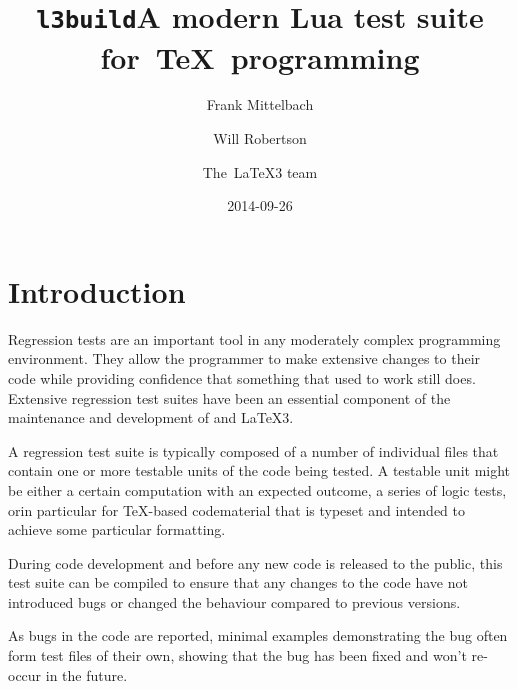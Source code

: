 \documentclass[final]{ltugboat}
\begin{document}
\title{\texttt{l3build}\Dash A modern Lua test suite for~\TeX~programming}
  \date{2014-09-26}

\author{Frank Mittelbach}
\address{Mainz, Germany}

\author{Will Robertson}
\address{School of Mechanical Engineering, The University of Adelaide, Australia}

\author{The~\LaTeX3 team}



\newcommand\drivername{build.lua}
\newcommand\makename{l3build.lua}
\newcommand\execname{texlua \drivername}
\newcommand\compdirname{test/}

\newcommand\pdfTeX{pdf\TeX}
\newcommand\luaTeX{Lua\TeX}

\maketitle

\tableofcontents

\section{Introduction}

Regression tests are an important tool in any moderately complex
programming environment.  They allow the programmer to make extensive
changes to their code while providing confidence that something that
used to work still does.  Extensive regression test suites have been
an essential component of the maintenance and development of \LaTeXe{}
and \LaTeX3.

A regression test suite is typically composed of a number of
individual files that contain one or more testable units of the code
being tested. A testable unit might be either a certain computation
with an expected outcome, a series of logic tests, or\Dash in
particular for \TeX{}-based code\Dash material that is typeset and
intended to achieve some particular formatting.

During code development and before any new code is released to the
public, this test suite can be compiled to ensure that any changes to
the code have not introduced bugs or changed the behaviour compared to
previous versions.

As bugs in the code are reported, minimal examples demonstrating the
bug often form test files of their own, showing that the bug has been
fixed and won't re-occur in the future.
\end{document}
